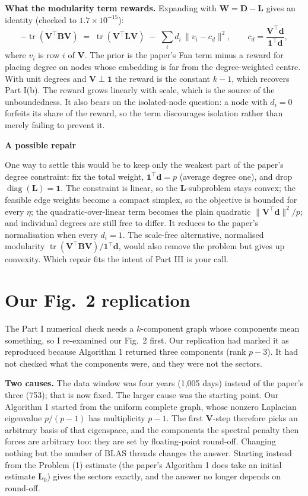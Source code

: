 \documentclass[11pt,a4paper]{article}
\newcommand{\Lap}{\mathbf{L}}
\newcommand{\Wmat}{\mathbf{W}}
\newcommand{\Bmat}{\mathbf{B}}
\newcommand{\Vmat}{\mathbf{V}}
\newcommand{\dvec}{\mathbf{d}}
\newcommand{\one}{\mathbf{1}}
\newcommand{\tr}{\operatorname{tr}}
\newenvironment{aside}[1]
 {\par\vspace{2.5mm}\begin{lrbox}{\asidebox}%
  \begin{minipage}{\dimexpr\textwidth-16pt\relax}\small\textbf{#1}\par\vspace{1mm}}
 {\end{minipage}\end{lrbox}%
  \noindent\setlength{\fboxsep}{7pt}\setlength{\fboxrule}{.4pt}%
  \fcolorbox{Rule}{Panel2}{\usebox{\asidebox}}\par\vspace{2.5mm}}
\begin{document}
\textbf{What the modularity term rewards.} Expanding with $\Wmat=\mathbf{D}-\Lap$
gives an identity (checked to $1.7\times10^{-15}$):
\[
  -\tr(\Vmat^\top\Bmat\Vmat)\;=\;\tr(\Vmat^\top\Lap\Vmat)\;-\;\sum_i d_i\,\lVert v_i-c_d\rVert^2,
  \qquad c_d=\frac{\Vmat^\top\dvec}{\one^\top\dvec},
\]
where $v_i$ is row $i$ of $\Vmat$. The prior is the paper's Fan term minus a reward
for placing degree on nodes whose embedding is far from the degree-weighted centre.
With unit degrees and $\Vmat\perp\one$ the reward is the constant $k-1$, which
recovers Part I(b). The reward grows linearly with scale, which is the source of the
unboundedness. It also bears on the isolated-node question: a node with $d_i=0$
forfeits its share of the reward, so the term discourages isolation rather than
merely failing to prevent it.

\begin{aside}{A possible repair}
One way to settle this would be to keep only the weakest part of the paper's degree
constraint: fix the total weight, $\one^\top\dvec=p$ (average degree one), and drop
$\operatorname{diag}(\Lap)=\one$. The constraint is linear, so the $\Lap$-subproblem
stays convex; the feasible edge weights become a compact simplex, so the objective is
bounded for every $\eta$; the quadratic-over-linear term becomes the plain quadratic
$\lVert\Vmat^\top\dvec\rVert^2/p$; and individual degrees are still free to differ.
It reduces to the paper's normalisation when every $d_i=1$. The scale-free
alternative, normalised modularity $\tr(\Vmat^\top\Bmat\Vmat)/\one^\top\dvec$, would
also remove the problem but gives up convexity. Which repair fits the intent of Part
III is your call.
\end{aside}

\section{Our Fig.~2 replication}\label{sec:fig2}

The Part I numerical check needs a $k$-component graph whose components mean
something, so I re-examined our Fig.~2 first. Our replication had marked it as
reproduced because Algorithm 1 returned three components (rank $p-3$). It had not
checked what the components were, and they were not the sectors.

\textbf{Two causes.} The data window was four years (1{,}005 days) instead of the
paper's three (753); that is now fixed. The larger cause was the starting point. Our
Algorithm 1 started from the uniform complete graph, whose nonzero Laplacian
eigenvalue $p/(p-1)$ has multiplicity $p-1$. The first $\Vmat$-step therefore picks an
arbitrary basis of that eigenspace, and the components the spectral penalty then
forces are arbitrary too: they are set by floating-point round-off. Changing nothing
but the number of BLAS threads changes the answer. Starting instead from the Problem
(1) estimate (the paper's Algorithm 1 does take an initial estimate $\Lap_0$) gives
the sectors exactly, and the answer no longer depends on round-off.
\end{document}
